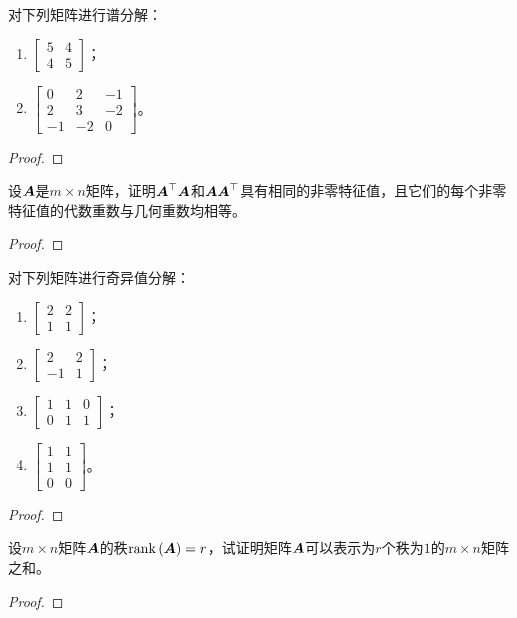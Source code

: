 \begin{problem}
对下列矩阵进行谱分解：
\begin{enumerate}
    \item \(\begin{bmatrix}5&4\\4&5\end{bmatrix}\)；
    \item \(\begin{bmatrix}0&2&-1\\2&3&-2\\-1&-2&0\end{bmatrix}\)。
\end{enumerate}
\end{problem}
\begin{proof}
\end{proof}

\begin{problem}
设\(\boldsymbol{A}\)是\(m\times n\)矩阵，证明\(\boldsymbol{A}^\top\boldsymbol{A}\)和\(\boldsymbol{A}\boldsymbol{A}^\top\)具有相同的非零特征值，且它们的每个非零特征值的代数重数与几何重数均相等。
\end{problem}
\begin{proof}
\end{proof}

\begin{problem}
对下列矩阵进行奇异值分解：
\begin{enumerate}
    \item \(\begin{bmatrix}2&2\\1&1\end{bmatrix}\)；
    \item \(\begin{bmatrix}2&2\\-1&1\end{bmatrix}\)；
    \item \(\begin{bmatrix}1&1&0\\0&1&1\end{bmatrix}\)；
    \item \(\begin{bmatrix}1&1\\1&1\\0&0\end{bmatrix}\)。
\end{enumerate}
\end{problem}
\begin{proof}
\end{proof}

\begin{problem}
设\(m\times n\)矩阵\(\boldsymbol{A}\)的秩\(\mathrm{rank}\left( \boldsymbol{A} \right)=r\)，试证明矩阵\(\boldsymbol{A}\)可以表示为\(r\)个秩为\(1\)的\(m\times n\)矩阵之和。
\end{problem}
\begin{proof}
\end{proof}

